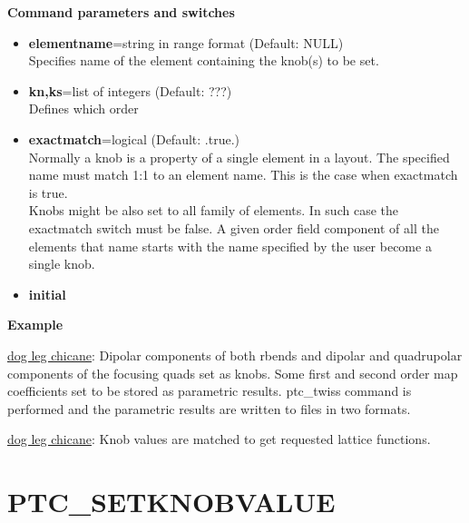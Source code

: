{\bf Command parameters and switches}
\begin{itemize}
   \item {\bf elementname}=string in range format (Default: NULL)\\
     Specifies name of the element containing the knob(s) to be set.   
   \item {\bf kn,ks}=list of integers (Default: ???)\\
     Defines which order    
   \item {\bf exactmatch}=logical (Default: .true.)\\
     Normally a knob is a property of a single element in a layout.
     The specified name must match 1:1 to an element name. This is the
     case when exactmatch is true.\\  
     Knobs might be also set to all family of elements. In such case
     the exactmatch switch must be false. A given order field
     component of all the elements that name starts with the
     name specified by the user become a single knob.
   \item {\bf initial}
\end{itemize}


{\bf Example}

\href{http://cern.ch/frs/mad-X_examples/ptc_madx_interface/knobs/knobs.madx}{dog
  leg chicane}: Dipolar components of both rbends and dipolar and
quadrupolar components of the focusing quads set as knobs. Some first
and second order map coefficients set to be stored as parametric
results. ptc\_twiss command is performed and the parametric results are
written to files in two formats. 

\href{http://cern.ch/frs/mad-X_examples/ptc_madx_interface/matchknobs/matchknobs.madx}{dog
  leg chicane}: Knob values are matched to get requested lattice
functions.  


 
% 



%

\section{PTC\_SETKNOBVALUE}

